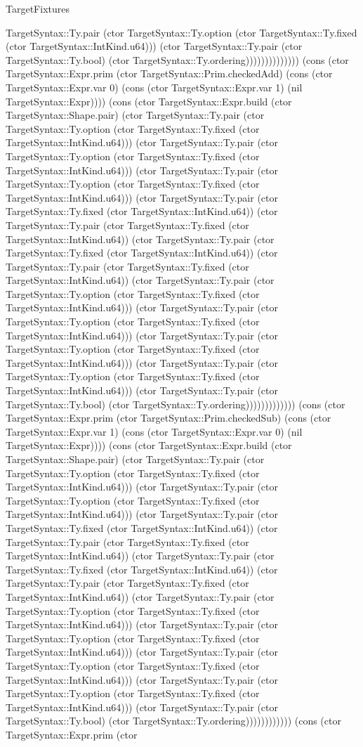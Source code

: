\begin{lexlean}{TargetFixtures}
\begin{semanticmodule}
{TargetSyntax::Ty.pair (ctor TargetSyntax::Ty.option (ctor TargetSyntax::Ty.fixed (ctor TargetSyntax::IntKind.u64))) (ctor TargetSyntax::Ty.pair (ctor TargetSyntax::Ty.bool) (ctor TargetSyntax::Ty.ordering)))))))))))))) (cons (ctor TargetSyntax::Expr.prim (ctor TargetSyntax::Prim.checkedAdd) (cons (ctor TargetSyntax::Expr.var 0) (cons (ctor TargetSyntax::Expr.var 1) (nil TargetSyntax::Expr)))) (cons (ctor TargetSyntax::Expr.build (ctor TargetSyntax::Shape.pair) (ctor TargetSyntax::Ty.pair (ctor TargetSyntax::Ty.option (ctor TargetSyntax::Ty.fixed (ctor TargetSyntax::IntKind.u64))) (ctor TargetSyntax::Ty.pair (ctor TargetSyntax::Ty.option (ctor TargetSyntax::Ty.fixed (ctor TargetSyntax::IntKind.u64))) (ctor TargetSyntax::Ty.pair (ctor TargetSyntax::Ty.option (ctor TargetSyntax::Ty.fixed (ctor TargetSyntax::IntKind.u64))) (ctor TargetSyntax::Ty.pair (ctor TargetSyntax::Ty.fixed (ctor TargetSyntax::IntKind.u64)) (ctor TargetSyntax::Ty.pair (ctor TargetSyntax::Ty.fixed (ctor TargetSyntax::IntKind.u64)) (ctor TargetSyntax::Ty.pair (ctor TargetSyntax::Ty.fixed (ctor TargetSyntax::IntKind.u64)) (ctor TargetSyntax::Ty.pair (ctor TargetSyntax::Ty.fixed (ctor TargetSyntax::IntKind.u64)) (ctor TargetSyntax::Ty.pair (ctor TargetSyntax::Ty.option (ctor TargetSyntax::Ty.fixed (ctor TargetSyntax::IntKind.u64))) (ctor TargetSyntax::Ty.pair (ctor TargetSyntax::Ty.option (ctor TargetSyntax::Ty.fixed (ctor TargetSyntax::IntKind.u64))) (ctor TargetSyntax::Ty.pair (ctor TargetSyntax::Ty.option (ctor TargetSyntax::Ty.fixed (ctor TargetSyntax::IntKind.u64))) (ctor TargetSyntax::Ty.pair (ctor TargetSyntax::Ty.option (ctor TargetSyntax::Ty.fixed (ctor TargetSyntax::IntKind.u64))) (ctor TargetSyntax::Ty.pair (ctor TargetSyntax::Ty.bool) (ctor TargetSyntax::Ty.ordering))))))))))))) (cons (ctor TargetSyntax::Expr.prim (ctor TargetSyntax::Prim.checkedSub) (cons (ctor TargetSyntax::Expr.var 1) (cons (ctor TargetSyntax::Expr.var 0) (nil TargetSyntax::Expr)))) (cons (ctor TargetSyntax::Expr.build (ctor TargetSyntax::Shape.pair) (ctor TargetSyntax::Ty.pair (ctor TargetSyntax::Ty.option (ctor TargetSyntax::Ty.fixed (ctor TargetSyntax::IntKind.u64))) (ctor TargetSyntax::Ty.pair (ctor TargetSyntax::Ty.option (ctor TargetSyntax::Ty.fixed (ctor TargetSyntax::IntKind.u64))) (ctor TargetSyntax::Ty.pair (ctor TargetSyntax::Ty.fixed (ctor TargetSyntax::IntKind.u64)) (ctor TargetSyntax::Ty.pair (ctor TargetSyntax::Ty.fixed (ctor TargetSyntax::IntKind.u64)) (ctor TargetSyntax::Ty.pair (ctor TargetSyntax::Ty.fixed (ctor TargetSyntax::IntKind.u64)) (ctor TargetSyntax::Ty.pair (ctor TargetSyntax::Ty.fixed (ctor TargetSyntax::IntKind.u64)) (ctor TargetSyntax::Ty.pair (ctor TargetSyntax::Ty.option (ctor TargetSyntax::Ty.fixed (ctor TargetSyntax::IntKind.u64))) (ctor TargetSyntax::Ty.pair (ctor TargetSyntax::Ty.option (ctor TargetSyntax::Ty.fixed (ctor TargetSyntax::IntKind.u64))) (ctor TargetSyntax::Ty.pair (ctor TargetSyntax::Ty.option (ctor TargetSyntax::Ty.fixed (ctor TargetSyntax::IntKind.u64))) (ctor TargetSyntax::Ty.pair (ctor TargetSyntax::Ty.option (ctor TargetSyntax::Ty.fixed (ctor TargetSyntax::IntKind.u64))) (ctor TargetSyntax::Ty.pair (ctor TargetSyntax::Ty.bool) (ctor TargetSyntax::Ty.ordering)))))))))))) (cons (ctor TargetSyntax::Expr.prim (ctor }
\end{semanticmodule}
\end{lexlean}
